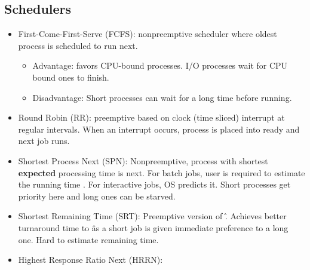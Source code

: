 \documentclass[fontsize=5pt]{scrartcl}
\begin{document}
\begin{multicols}{3}
      \subsection{Schedulers}
        \begin{itemize}
         \item First-Come-First-Serve (FCFS): nonpreemptive scheduler where oldest process is scheduled to run next.
         \begin{itemize}
           \item Advantage: favors CPU-bound processes. I/O processes wait for CPU bound ones to finish.
           \item Disadvantage: Short processes can wait for a long time before running.
         \end{itemize}
         \item Round Robin (RR): preemptive based on clock (time sliced) interrupt at regular intervals. When an interrupt occurs, process is placed into ready and next job runs.
         \item Shortest Process Next (SPN): Nonpreemptive, process with shortest \textbf{expected} processing time is next. For batch jobs, user is required to estimate the running time
               . For interactive jobs, OS predicts it. Short processes get priority here and long ones can be starved.
         \item Shortest Remaining Time (SRT): Preemptive version of \^. Achieves better turnaround time to \^ as a short job is given immediate preference to a long one. Hard to estimate remaining time.
         \item Highest Response Ratio Next (HRRN): 
        \end{itemize}




    

\end{multicols}
\end{document}
